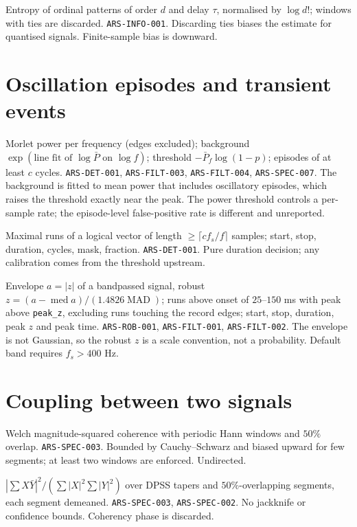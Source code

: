 {Entropy of ordinal patterns of order $d$ and delay $\tau$, normalised by $\log d!$; windows with ties are discarded.}
{\texttt{ARS-INFO-001}.}
{Discarding ties biases the estimate for quantised signals. Finite-sample bias is downward.}

\section{Oscillation episodes and transient events}
{Morlet power per frequency (edges excluded); background $\exp(\text{line fit of }\log\bar P\text{ on }\log f)$; threshold $-\bar P_f\log(1-p)$; episodes of at least $c$ cycles.}
{\texttt{ARS-DET-001}, \texttt{ARS-FILT-003}, \texttt{ARS-FILT-004}, \texttt{ARS-SPEC-007}.}
{The background is fitted to mean power that includes oscillatory episodes, which raises the threshold exactly near the peak. The power threshold controls a per-sample rate; the episode-level false-positive rate is different and unreported.}

{Maximal runs of a logical vector of length $\ge\lceil cf_s/f\rceil$ samples; start, stop, duration, cycles, mask, fraction.}
{\texttt{ARS-DET-001}.}
{Pure duration decision; any calibration comes from the threshold upstream.}

{Envelope $a=|z|$ of a bandpassed signal, robust $z=(a-\operatorname{med}a)/(1.4826\operatorname{MAD})$; runs above onset of $25$--$150$ ms with peak above \texttt{peak\_z}, excluding runs touching the record edges; start, stop, duration, peak $z$ and peak time.}
{\texttt{ARS-ROB-001}, \texttt{ARS-FILT-001}, \texttt{ARS-FILT-002}.}
{The envelope is not Gaussian, so the robust $z$ is a scale convention, not a probability. Default band requires $f_s>400$ Hz.}

\section{Coupling between two signals}
{Welch magnitude-squared coherence with periodic Hann windows and $50\%$ overlap.}
{\texttt{ARS-SPEC-003}.}
{Bounded by Cauchy--Schwarz and biased upward for few segments; at least two windows are enforced. Undirected.}

{$|\sum X\bar Y|^2/(\sum|X|^2\sum|Y|^2)$ over DPSS tapers and $50\%$-overlapping segments, each segment demeaned.}
{\texttt{ARS-SPEC-003}, \texttt{ARS-SPEC-002}.}
{No jackknife or confidence bounds. Coherency phase is discarded.}


